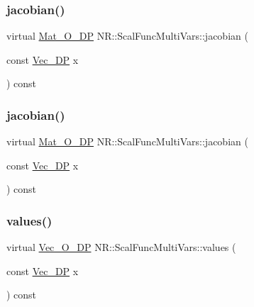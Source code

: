 \subsubsection{\texorpdfstring{jacobian()}{jacobian()}\hspace{0.1cm}{\footnotesize\ttfamily [2/3]}}
{\footnotesize\ttfamily virtual \mbox{\hyperlink{namespaceNR_adc1f8da33094b6bbeb1f5f899515ce54}{Mat\+\_\+\+O\+\_\+\+DP}} N\+R\+::\+Scal\+Func\+Multi\+Vars\+::jacobian (\begin{DoxyParamCaption}\item[{const \mbox{\hyperlink{namespaceNR_a115a3196718c98e8e2562d80b06c23c5}{Vec\+\_\+\+DP}}}]{x }\end{DoxyParamCaption}) const\hspace{0.3cm}{\ttfamily [pure virtual]}}

\mbox{\label{classNR_1_1ScalFuncMultiVars_ab8dd80ced0a7b26584bde4e34444c04a}} 
\subsubsection{\texorpdfstring{jacobian()}{jacobian()}\hspace{0.1cm}{\footnotesize\ttfamily [3/3]}}
{\footnotesize\ttfamily virtual \mbox{\hyperlink{namespaceNR_adc1f8da33094b6bbeb1f5f899515ce54}{Mat\+\_\+\+O\+\_\+\+DP}} N\+R\+::\+Scal\+Func\+Multi\+Vars\+::jacobian (\begin{DoxyParamCaption}\item[{const \mbox{\hyperlink{namespaceNR_a115a3196718c98e8e2562d80b06c23c5}{Vec\+\_\+\+DP}}}]{x }\end{DoxyParamCaption}) const\hspace{0.3cm}{\ttfamily [pure virtual]}}

\mbox{\label{classNR_1_1ScalFuncMultiVars_a5345ed027a649e71ae8ae3c8dadb436c}} 
\subsubsection{\texorpdfstring{values()}{values()}\hspace{0.1cm}{\footnotesize\ttfamily [1/3]}}
{\footnotesize\ttfamily virtual \mbox{\hyperlink{namespaceNR_a970094d23441f8ef6a45282a7eb2103d}{Vec\+\_\+\+O\+\_\+\+DP}} N\+R\+::\+Scal\+Func\+Multi\+Vars\+::values (\begin{DoxyParamCaption}\item[{const \mbox{\hyperlink{namespaceNR_a115a3196718c98e8e2562d80b06c23c5}{Vec\+\_\+\+DP}}}]{x }\end{DoxyParamCaption}) const\hspace{0.3cm}{\ttfamily [pure virtual]}}

